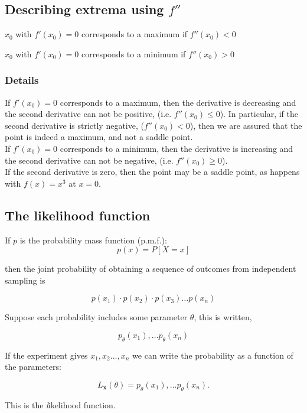 \documentclass[12pt,a4paper]{article}
\theoremstyle{regla}
\theoremstyle{remark}
\theoremstyle{definition}
\theoremstyle{nonumberbreak}
\begin{document}
\subsection{Describing extrema using $f''$}
\begin{fbox}
\begin{minipage}{0.97\textwidth}
$x_0$ with $f'(x_0)=0$ corresponds to a maximum if  $f''(x_0)<0$

$x_0$ with $f'(x_0)=0$ corresponds to a minimum if  $f''(x_0)>0$


\end{minipage}
\end{fbox}
\subsubsection{Details}
If $f'(x_0)=0$ corresponds to a maximum, then the derivative is decreasing and the second derivative can not be positive, (i.e. $f''(x_0)\leq 0$).  In particular, if the second derivative is strictly negative, ($f''(x_0) <0$), then we are assured that the point is indeed a maximum, and not a saddle point.\\

If $f'(x_0)=0$ corresponds to a minimum, then the derivative is increasing and the second derivative can not be negative, (i.e. $f''(x_0) \geq 0$).\\

If the second derivative is zero, then the point may be a saddle point, as happens with $f(x)=x^3$ at $x=0$.



\subsection{The likelihood function}
\begin{fbox}
\begin{minipage}{0.97\textwidth}
If $p$ is the probability mass function (p.m.f.):
$$ p(x) = P [X = x] $$

then the joint probability of obtaining a sequence of outcomes from independent sampling is

$$ p(x_1) \cdot p(x_2) \cdot p(x_3) \ldots p(x_n)$$

Suppose each probability includes some parameter $\theta$, this is written,

$$ {p_{\theta}}(x_1),  \ldots {p_{\theta}}(x_n)$$

 

If the experiment gives $ x_1, x_2 \ldots, x_n$ we can write the probability as a function of the parameters:

$$ L_{\mathbf{x}}(\theta) = p_{\theta}(x_1),  \ldots p_{\theta}(x_n).$$

This is the {\emph likelihood function}.

\end{minipage}
\end{fbox}
\end{document}

